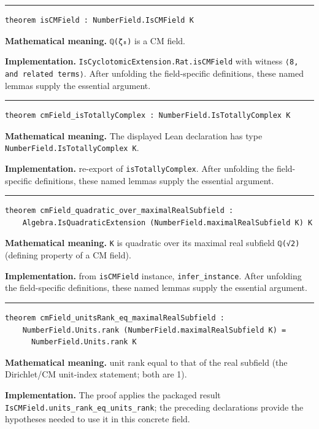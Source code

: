 \documentclass[UTF8,a4paper,11pt,fontset=fandol]{ctexart}
\theoremstyle{definition}
\newcommand{\statementsep}{\par\medskip\hrule\medskip}
\begin{document}
\statementsep
\begin{verbatim}
theorem isCMField : NumberField.IsCMField K
\end{verbatim}
\noindent\textbf{Mathematical meaning.} \texttt{ℚ(ζ₈)} is a CM field.\par
\noindent\textbf{Implementation.} \texttt{IsCyclotomicExtension.\allowbreak{}Rat.\allowbreak{}isCMField} with witness \texttt{⟨8, and related terms⟩}. After unfolding the field-specific definitions, these named lemmas supply the essential argument.\par
\statementsep
\begin{verbatim}
theorem cmField_isTotallyComplex : NumberField.IsTotallyComplex K
\end{verbatim}
\noindent\textbf{Mathematical meaning.} The displayed Lean declaration has type \texttt{NumberField.\allowbreak{}IsTotallyComplex K}.\par
\noindent\textbf{Implementation.} re-export of \texttt{isTotallyComplex}. After unfolding the field-specific definitions, these named lemmas supply the essential argument.\par
\statementsep
\begin{verbatim}
theorem cmField_quadratic_over_maximalRealSubfield :
    Algebra.IsQuadraticExtension (NumberField.maximalRealSubfield K) K
\end{verbatim}
\noindent\textbf{Mathematical meaning.} \texttt{K} is quadratic over its maximal real subfield \texttt{ℚ(√2)} (defining property of a CM field).\par
\noindent\textbf{Implementation.} from \texttt{isCMField} instance, \texttt{infer\_\allowbreak{}instance}. After unfolding the field-specific definitions, these named lemmas supply the essential argument.\par
\statementsep
\begin{verbatim}
theorem cmField_unitsRank_eq_maximalRealSubfield :
    NumberField.Units.rank (NumberField.maximalRealSubfield K) =
      NumberField.Units.rank K
\end{verbatim}
\noindent\textbf{Mathematical meaning.} unit rank equal to that of the real subfield (the Dirichlet/CM unit-index statement; both are 1).\par
\noindent\textbf{Implementation.} The proof applies the packaged result \texttt{IsCMField.\allowbreak{}units\_\allowbreak{}rank\_\allowbreak{}eq\_\allowbreak{}units\_\allowbreak{}rank}; the preceding declarations provide the hypotheses needed to use it in this concrete field.\par
\end{document}
